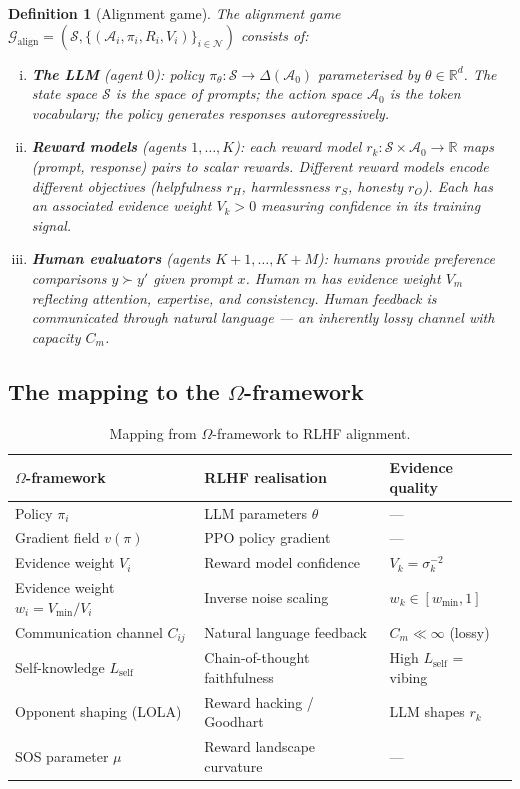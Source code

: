 \documentclass[11pt,a4paper]{article}
\newtheorem{definition}[theorem]{Definition}
\newcommand{\R}{\mathbb{R}}
\newcommand{\cS}{\mathcal{S}}
\newcommand{\cA}{\mathcal{A}}
\begin{document}
\begin{definition}[Alignment game]
\label{def:alignment-game}
The alignment game $\mathcal{G}_{\mathrm{align}} = (\cS, \{(\cA_i, \pi_i, R_i, V_i)\}_{i \in \mathcal{N}})$ consists of:
\begin{enumerate}[(i)]
    \item \textbf{The LLM} (agent $0$): policy $\pi_\theta : \cS \to \Delta(\cA_0)$ parameterised by $\theta \in \R^d$. The state space $\cS$ is the space of prompts; the action space $\cA_0$ is the token vocabulary; the policy generates responses autoregressively.

    \item \textbf{Reward models} (agents $1, \ldots, K$): each reward model $r_k : \cS \times \cA_0 \to \R$ maps (prompt, response) pairs to scalar rewards. Different reward models encode different objectives (helpfulness $r_H$, harmlessness $r_S$, honesty $r_O$). Each has an associated evidence weight $V_k > 0$ measuring confidence in its training signal.

    \item \textbf{Human evaluators} (agents $K+1, \ldots, K+M$): humans provide preference comparisons $y \succ y'$ given prompt $x$. Human $m$ has evidence weight $V_m$ reflecting attention, expertise, and consistency. Human feedback is communicated through natural language --- an inherently lossy channel with capacity $C_m$.
\end{enumerate}
\end{definition}

\subsection{The mapping to the $\Omega$-framework}

\begin{table}[htbp]
\centering
\caption{Mapping from $\Omega$-framework to RLHF alignment.}
\label{tab:mapping}
\begin{tabular}{@{}lll@{}}
\toprule
\textbf{$\Omega$-framework} & \textbf{RLHF realisation} & \textbf{Evidence quality} \\
\midrule
Policy $\pi_i$ & LLM parameters $\theta$ & --- \\
Gradient field $v(\pi)$ & PPO policy gradient & --- \\
Evidence weight $V_i$ & Reward model confidence & $V_k = \sigma_k^{-2}$ \\
Evidence weight $w_i = V_{\min}/V_i$ & Inverse noise scaling & $w_k \in [w_{\min}, 1]$ \\
Communication channel $C_{ij}$ & Natural language feedback & $C_m \ll \infty$ (lossy) \\
Self-knowledge $L_{\mathrm{self}}$ & Chain-of-thought faithfulness & High $L_{\mathrm{self}}$ = vibing \\
Opponent shaping (LOLA) & Reward hacking / Goodhart & LLM shapes $r_k$ \\
SOS parameter $\mu$ & Reward landscape curvature & --- \\
\bottomrule
\end{tabular}
\end{table}
\end{document}
